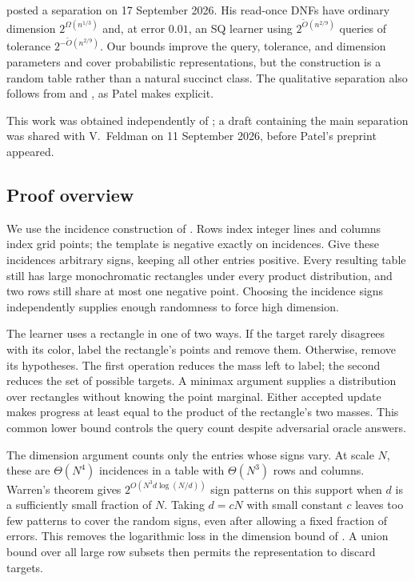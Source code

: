 \documentclass[11pt,letterpaper,pmlr,twoside]{jmlr}
\newif\ifreview
\begin{document}
\citet{Patel26} posted a separation on 17 September 2026. His read-once DNFs have ordinary dimension $2^{\Omega(n^{1/3})}$ and, at error $0.01$, an SQ learner using $2^{\widetilde O(n^{2/9})}$ queries of tolerance $2^{-\widetilde O(n^{2/9})}$. Our bounds improve the query, tolerance, and dimension parameters and cover probabilistic representations, but the construction is a random table rather than a natural succinct class. The qualitative separation also follows from \citet{DKR25} and \citet{RS10}, as Patel makes explicit.
\ifreview
This work was obtained independently of \citet{Patel26}.
\else
This work was obtained independently of \citet{Patel26}; a draft containing the main separation was shared with V.\ Feldman on 11 September 2026, before Patel's preprint appeared.
\fi

\subsection{Proof overview}\label{sec:techniques}
We use the incidence construction of \citet{HHPTZ22}. Rows index integer lines and columns index grid points; the template is negative exactly on incidences. Give these incidences arbitrary signs, keeping all other entries positive. Every resulting table still has large monochromatic rectangles under every product distribution, and two rows still share at most one negative point. Choosing the incidence signs independently supplies enough randomness to force high dimension.

The learner uses a rectangle in one of two ways. If the target rarely disagrees with its color, label the rectangle's points and remove them. Otherwise, remove its hypotheses. The first operation reduces the mass left to label; the second reduces the set of possible targets. A minimax argument supplies a distribution over rectangles without knowing the point marginal. Either accepted update makes progress at least equal to the product of the rectangle's two masses. This common lower bound controls the query count despite adversarial oracle answers.

The dimension argument counts only the entries whose signs vary. At scale $N$, these are $\Theta(N^4)$ incidences in a table with $\Theta(N^3)$ rows and columns. Warren's theorem gives $2^{O(N^3d\log(N/d))}$ sign patterns on this support when $d$ is a sufficiently small fraction of $N$. Taking $d=cN$ with small constant $c$ leaves too few patterns to cover the random signs, even after allowing a fixed fraction of errors. This removes the logarithmic loss in the dimension bound of \citet{HHPTZ22}. A union bound over all large row subsets then permits the representation to discard targets.
\end{document}
